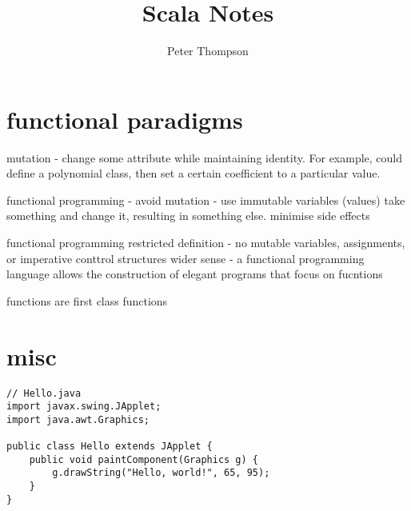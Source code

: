 \documentclass{article}
\title{Scala Notes}
\author{Peter Thompson}
\begin{document}
\section{functional paradigms}


mutation - change some attribute while maintaining identity. For example, could define a polynomial class, then set a certain coefficient to a particular value.

functional programming - avoid mutation - use immutable variables (values)
take something and change it, resulting in something else.
minimise side effects

functional programming
restricted definition - no mutable variables, assignments, or imperative conttrol structures
wider sense - a functional programming language allows the construction of elegant programs that focus on fucntions

functions are first class functions

\section{misc}

\begin{lstlisting}
// Hello.java
import javax.swing.JApplet;
import java.awt.Graphics;

public class Hello extends JApplet {
    public void paintComponent(Graphics g) {
        g.drawString("Hello, world!", 65, 95);
    }    
}
\end{lstlisting}
\end{document}
